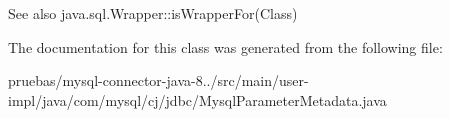 \begin{DoxySeeAlso}{See also}
java.\+sql.\+Wrapper\+::is\+Wrapper\+For(\+Class) 
\end{DoxySeeAlso}


The documentation for this class was generated from the following file\+:\begin{DoxyCompactItemize}
\item 
pruebas/mysql-\/connector-\/java-\/8../src/main/user-\/impl/java/com/mysql/cj/jdbc/Mysql\+Parameter\+Metadata.\+java\end{DoxyCompactItemize}
